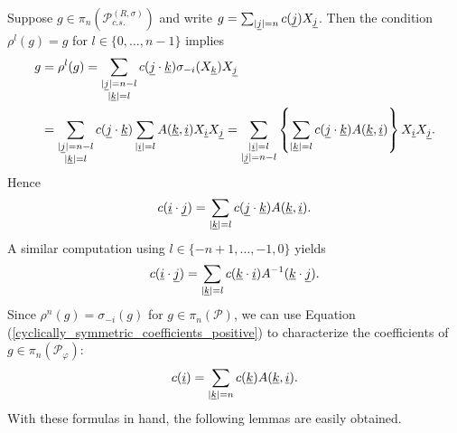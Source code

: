 Suppose $g\in\pi_n\left(\mathscr{P}^{(R,\sigma)}_{c.s.}\right)$ and write $g=\sum_{|\underline{j}|=n} c(\underline{j}) X_{\underline{j}}$. Then the condition $\rho^l(g)=g$ for $l\in \{0,\ldots, n-1\}$ implies
	\begin{align*}
		 g&=\rho^l(g)=\sum_{\substack{|\underline{j}|=n-l\\ |\underline{k}|=l}} c(\underline{j}\cdot \underline{k}) \sigma_{-i}(X_{\underline{k}})X_{\underline{j}} \\
		 	&= \sum_{\substack{|\underline{j}|=n-l\\ |\underline{k}|=l}} c(\underline{j}\cdot \underline{k})\sum_{|\underline{i}|=l} A(\underline{k},\underline{i}) X_{\underline{i}}X_{\underline{j}} = \sum_{\substack{|\underline{i}|=l\\ |\underline{j}|=n-l}} \left\{ \sum_{|\underline{k}|=l} c(\underline{j}\cdot \underline{k})A(\underline{k},\underline{i})\right\} X_{\underline{i}}X_{\underline{j}}.
	\end{align*}
Hence
	\begin{align}\label{cyclically_symmetric_coefficients_positive}
		c(\underline{i}\cdot\underline{j})=\sum_{|\underline{k}|=l} c(\underline{j}\cdot \underline{k}) A(\underline{k},\underline{i}).
	\end{align}
A similar computation using $l\in \{-n+1,\ldots, -1,0\}$ yields
	\begin{align}\label{cyclically_symmetric_coefficients_negative}
		c(\underline{i}\cdot\underline{j})=\sum_{|\underline{k}|=l} c(\underline{k}\cdot\underline{i}) A^{-1}(\underline{k}\cdot\underline{j}).
	\end{align}
Since $\rho^n(g)=\sigma_{-i}(g)$ for $g\in\pi_n(\mathscr{P})$, we can use Equation (\ref{cyclically_symmetric_coefficients_positive}) to characterize the coefficients of $g\in \pi_n\left(\mathscr{P}_\varphi\right)$:
	\begin{align}\label{centralizer_coefficients}
		c(\underline{i})=\sum_{|\underline{k}|=n} c(\underline{k}) A(\underline{k},\underline{i}).
	\end{align}
With these formulas in hand, the following lemmas are easily obtained.

